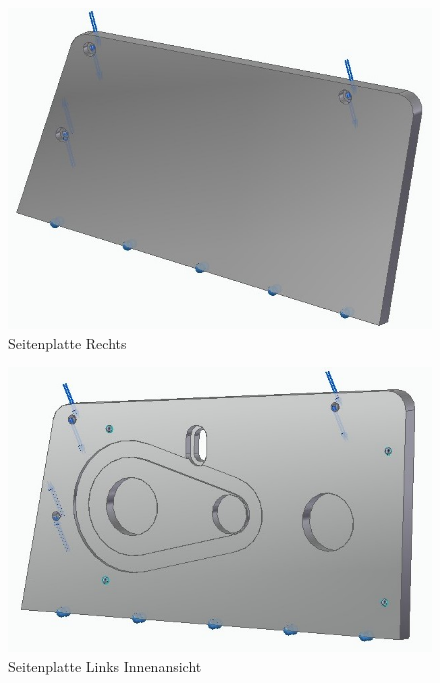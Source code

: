 \begin{figure} [H]
	\begin{center}
		\includegraphics[scale=0.5]{figures/mechanik/Seitenplatte_Rechts.jpg}
			\caption{Seitenplatte Rechts}
			\label{fig:Seitenplatte Rechts}
	\end{center}
\end{figure}

\begin{figure} [H]
	\begin{center}
		\includegraphics[scale=0.5]{figures/mechanik/Seitenplatte_Links_innen.jpg}
			\caption{Seitenplatte Links Innenansicht}
			\label{fig:Seitenplatte Links Innenansicht}
	\end{center}
\end{figure}


